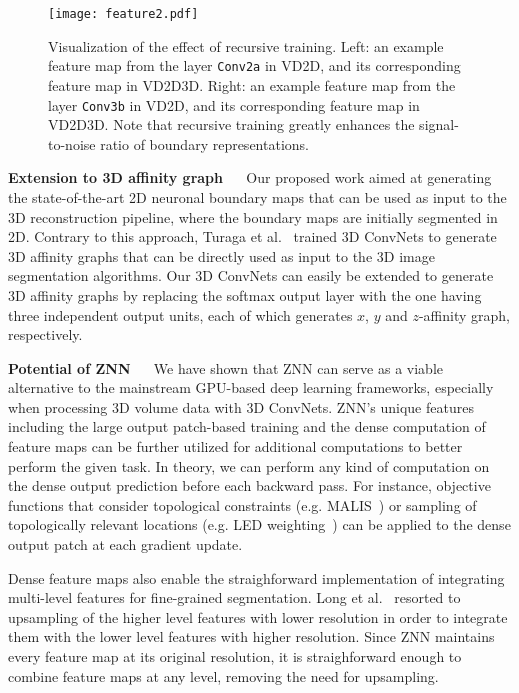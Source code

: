 \documentclass{article} %
\begin{document}
\begin{figure}[!t]
\begin{center}
\texttt{[image: feature2.pdf]}
\end{center}
\caption{Visualization of the effect of recursive training. Left: an example feature map from the layer \texttt{Conv2a} in VD2D, and its corresponding feature map in VD2D3D. Right: an example feature map from the layer \texttt{Conv3b} in VD2D, and its corresponding feature map in VD2D3D. Note that recursive training greatly enhances the signal-to-noise ratio of boundary representations.}
\label{feature}
\end{figure}

{\bf Extension to 3D affinity graph}
$\quad$
Our proposed work aimed at generating the state-of-the-art 2D neuronal boundary maps that can be used as input to the 3D reconstruction pipeline, where the boundary maps are initially segmented in 2D. Contrary to this approach, Turaga et al.~\cite{Turaga2010} trained 3D ConvNets to generate 3D affinity graphs that can be directly used as input to the 3D image segmentation algorithms. Our 3D ConvNets can easily be extended to generate 3D affinity graphs by replacing the softmax output layer with the one having three independent output units, each of which generates $x$, $y$ and $z$-affinity graph, respectively.

{\bf Potential of ZNN}
$\quad$
We have shown that ZNN can serve as a viable alternative to the mainstream GPU-based deep learning frameworks, especially when processing 3D volume data with 3D ConvNets. ZNN's unique features including the large output patch-based training and the dense computation of feature maps can be further utilized for additional computations to better perform the given task. In theory, we can perform any kind of computation on the dense output prediction before each backward pass. For instance, objective functions that consider topological constraints (e.g. MALIS~\cite{Turaga2009}) or sampling of topologically relevant locations (e.g. LED weighting~\cite{Huang2014}) can be applied to the dense output patch at each gradient update.

Dense feature maps also enable the straighforward implementation of integrating multi-level features for fine-grained segmentation. Long et al.~\cite{Long2015} resorted to upsampling of the higher level features with lower resolution in order to integrate them with the lower level features with higher resolution. Since ZNN maintains every feature map at its original resolution, it is straighforward enough to combine feature maps at any level, removing the need for upsampling.
\end{document}
